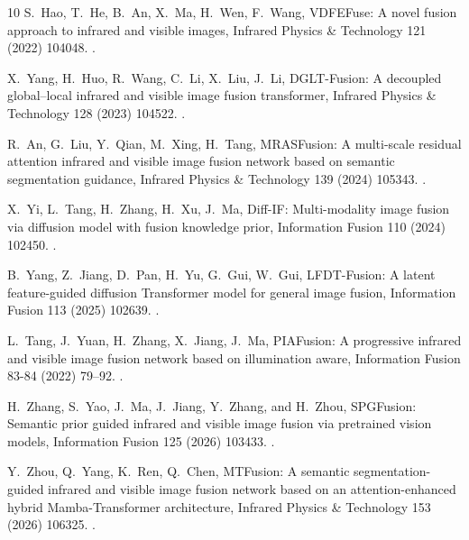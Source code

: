 \begin{thebibliography}{10}
S.~Hao, T.~He, B.~An, X.~Ma, H.~Wen, F.~Wang, {VDFEFuse: A novel fusion
  approach to infrared and visible images}, Infrared Physics \& Technology 121
  (2022) 104048.
\newblock \href {https://doi.org/10.1016/j.infrared.2022.104048}
  {}.

X.~Yang, H.~Huo, R.~Wang, C.~Li, X.~Liu, J.~Li, {DGLT-Fusion: A decoupled
  global–local infrared and visible image fusion transformer}, Infrared
  Physics \& Technology 128 (2023) 104522.
\newblock \href {https://doi.org/10.1016/j.infrared.2022.104522}
  {}.

R.~An, G.~Liu, Y.~Qian, M.~Xing, H.~Tang, {MRASFusion: A multi-scale residual
  attention infrared and visible image fusion network based on semantic
  segmentation guidance}, Infrared Physics \& Technology 139 (2024) 105343.
\newblock \href {https://doi.org/10.1016/j.infrared.2024.105343}
  {}.

X.~Yi, L.~Tang, H.~Zhang, H.~Xu, J.~Ma, {Diff-IF: Multi-modality image fusion
  via diffusion model with fusion knowledge prior}, Information Fusion 110
  (2024) 102450.
\newblock \href {https://doi.org/10.1016/j.inffus.2024.102450}
  {}.

B.~Yang, Z.~Jiang, D.~Pan, H.~Yu, G.~Gui, W.~Gui, {LFDT-Fusion: A latent
  feature-guided diffusion Transformer model for general image fusion},
  Information Fusion 113 (2025) 102639.
\newblock \href {https://doi.org/10.1016/j.inffus.2024.102639}
  {}.

L.~Tang, J.~Yuan, H.~Zhang, X.~Jiang, J.~Ma, {PIAFusion: A progressive infrared
  and visible image fusion network based on illumination aware}, Information
  Fusion 83-84 (2022) 79--92.
\newblock \href {https://doi.org/10.1016/j.inffus.2022.03.007}
  {}.

H.~Zhang, S.~Yao, J.~Ma, J.~Jiang, Y.~Zhang, and H.~Zhou, {SPGFusion: Semantic
  prior guided infrared and visible image fusion via pretrained vision models},
  Information Fusion 125 (2026) 103433.
\newblock \href {https://doi.org/10.1016/j.inffus.2025.103433}
  {}.

Y.~Zhou, Q.~Yang, K.~Ren, Q.~Chen, {MTFusion: A semantic segmentation-guided
  infrared and visible image fusion network based on an attention-enhanced
  hybrid Mamba-Transformer architecture}, Infrared Physics \& Technology 153
  (2026) 106325.
\newblock \href {https://doi.org/10.1016/j.infrared.2025.106325}
  {}.


\end{thebibliography}
